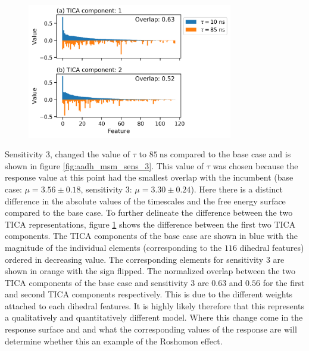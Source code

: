 \begin{figure}
    \centering
    \includegraphics[width=0.8\textwidth]{chapters/msm_optimization/figures/aadh_msm_sens_3_tica.png}
    \label{fig:aadh_msm_sens_3_tica}
\end{figure}

Sensitivity 3, changed the value of $\tau$ to $\SI{85}{\nano\second}$ compared to the base case and is shown in figure \ref{fig:aadh_msm_sens_3}.   This value of $\tau$ was chosen because the response value at this point had the smallest  overlap with the incumbent (base case: $\mu=3.56 \pm 0.18$, sensitivity 3: $\mu=3.30 \pm 0.24$).  Here there is a distinct difference in the absolute values of the timescales and the free energy surface compared to the base case. To further delineate the difference between the two TICA representations, figure \ref{fig:aadh_msm_sens_3_tica} shows the difference between the first two TICA components. The  TICA components of the base case are shown in blue with the magnitude of the individual elements (corresponding to the $116$ dihedral features) ordered in decreasing value. The corresponding elements for sensitivity 3 are shown in orange with the sign flipped. The normalized overlap between the two TICA components of the base case and sensitivity 3 are $0.63$ and $0.56$  for the first and second TICA components respectively. This is due to the different weights attached to each dihedral features. It is highly likely therefore that this represents a qualitatively and quantitatively different model. Where this change come in the response surface and and what the corresponding values of the response are will determine whether this an example of the Roshomon effect. 


